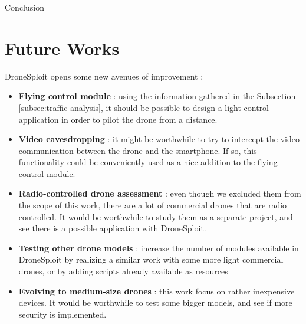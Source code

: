 \begin{chaptercover}{Conclusion}
\section{Future Works} \label{sec:future-works}
DroneSploit opens some new avenues of improvement :
{\hyphenation{}
\begin{itemize}[itemsep=0.02cm,topsep=0.02cm]
  \item \textbf{Flying control module} : using the information gathered in the Subsection \ref{subsec:traffic-analysis}, it should be possible to design a light control application in order to pilot the drone from a distance. 
  \item \textbf{Video eavesdropping} : it might be worthwhile to try to intercept the video communication between the drone and the smartphone. If so, this functionality could be conveniently used as a nice addition to the flying control module.
  \item \textbf{Radio-controlled drone assessment} : even though we excluded them from the scope of this work, there are a lot of commercial drones that are radio controlled. It would be worthwhile to study them as a separate project, and see there is a possible application with DroneSploit.
  \item \textbf{Testing other drone models} : increase the number of modules available in DroneSploit by realizing a similar work with some more light commercial drones, or by adding scripts already available as resources
  \item \textbf{Evolving to medium-size drones} :  this work focus on rather inexpensive devices. It would be worthwhile to test some bigger models, and see if more security is implemented.
\end{itemize}}

\end{chaptercover}
